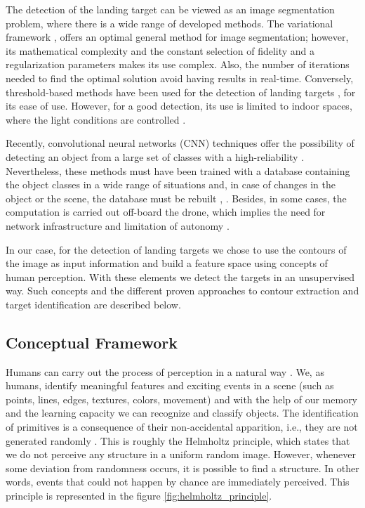 The detection of the landing target can be viewed as an image segmentation problem, where there is a wide range of developed methods. The variational framework \citep{Mumford.Shah:CPAM:1989}, offers an optimal general method for image segmentation; however, its mathematical complexity and the constant selection of fidelity and a regularization parameters makes its use complex. Also, the number of iterations needed to find the optimal solution avoid having results in real-time. Conversely, threshold-based methods have been used for the detection of landing targets \citep{Lacroix.Caballero:IROS:2006}, \citep{Lange.Sunderhauf.ea:SIMPAR:2008} for its ease of use. However, for a good detection, its use is limited to indoor spaces, where the light conditions are controlled \citep{Araar.Aouf.ea:IROS:2017}. 

Recently, convolutional neural networks (CNN) techniques offer the possibility of detecting an object from a large set of classes with a high-reliability \citep{Carrio.Sampedro.ea:JS:2017}. Nevertheless, these methods must have been trained with a database containing the object classes in a wide range of situations and, in case of changes in the object or the scene, the database must be rebuilt \citep{Yao.Yu.ea:CCC:2017}, \citep{Furukawa:TechRep:2018}. Besides, in some cases, the computation is carried out off-board the drone, which implies the need for network infrastructure and limitation of autonomy \citep{Lee.Wang.ea:IRC:2017}.

In our case, for the detection of landing targets we chose to use the contours of the image as input information and build a feature space using concepts of human perception. With these elements we detect the targets in an unsupervised way. Such concepts and the different proven approaches to contour extraction and target identification are described below.

\subsection{Conceptual Framework}
Humans can carry out the process of perception in a natural way \citep{Petitot:Neurogeometrie:2008}. We, as humans, identify meaningful features and exciting events in a scene (such as points, lines, edges, textures, colors, movement) and with the help of our memory and the learning capacity we can recognize and classify objects. The  identification of primitives is a consequence of their non-accidental apparition, i.e., they are not generated randomly \citep{Attneave:PR:1954}. This is roughly the Helmholtz principle, which states that we do not perceive any structure in a uniform random image. However, whenever some deviation from randomness occurs, it is possible to find a structure. In other words, events that could not happen by chance are immediately perceived. This principle is represented in the figure \ref{fig:helmholtz_principle}.

